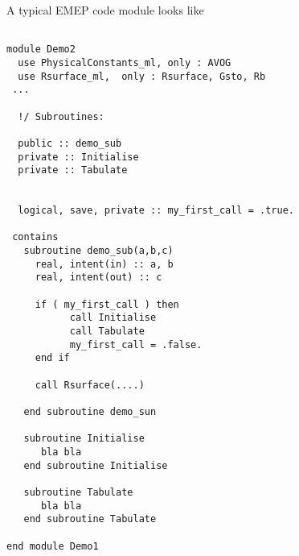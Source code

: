 A typical EMEP code module looks like
\begin{verbatim}

module Demo2
  use PhysicalConstants_ml, only : AVOG
  use Rsurface_ml,  only : Rsurface, Gsto, Rb
 ...

  !/ Subroutines:

  public :: demo_sub
  private :: Initialise
  private :: Tabulate


  logical, save, private :: my_first_call = .true.

 contains
   subroutine demo_sub(a,b,c)
     real, intent(in) :: a, b
     real, intent(out) :: c

     if ( my_first_call ) then
           call Initialise
           call Tabulate
           my_first_call = .false.
     end if

     call Rsurface(....)

   end subroutine demo_sun

   subroutine Initialise
      bla bla 
   end subroutine Initialise

   subroutine Tabulate
      bla bla 
   end subroutine Tabulate

end module Demo1

\end{verbatim}

